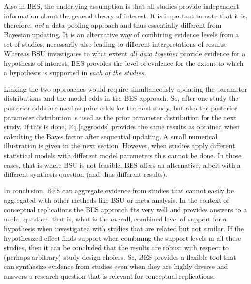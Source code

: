 \documentclass[11pt,reqno]{article}
\begin{document}
Also in BES, the underlying assumption is that all studies provide independent information about the general theory of interest. It is important to note that it is, therefore, \emph{not} a data pooling approach and thus essentially different from Bayesian updating. It is an alternative way of combining evidence levels from a set of studies, necessarily also leading to different interpretations of results. Whereas BSU investigates to what extent \emph{all data together} provide evidence for a hypothesis of interest, BES provides the level of evidence for the extent to which a hypothesis is supported in \emph{each of the studies}.

Linking the two approaches would require simultaneously updating the parameter distributions and the model odds in the BES approach. 
So, after one study the posterior odds are used as prior odds for the next study, but also the posterior parameter distribution is used as the prior parameter distribution for the next study.
If this is done, Eq.\ref{aggrodds} provides the same results as obtained when calculting the Bayes factor after sequential updating. 
A small numerical illustration is given in the next section.
However, when studies apply different statistical models with different model parameters this cannot be done. In those cases, that is where BSU is not feasible, BES offers an alternative, albeit with a different synthesis question (and thus different results).

In conclusion, BES can aggregate evidence from studies that cannot easily be aggregated with other methods like BSU or meta-analysis. In the context of conceptual replications the BES approach fits very well and provides answers to a useful question, that is, what is the overall, combined level of support for a hypothesis when investigated with studies that are related but not similar. If the hypothesized effect finds support when combining the support levels in all these studies, then it can be concluded that the results are robust with respect to (perhaps arbitrary) study design choices. So, BES provides a flexible tool that can synthesize evidence from studies even when they are highly diverse and answers a research question that is relevant for conceptual replications.
\end{document}
